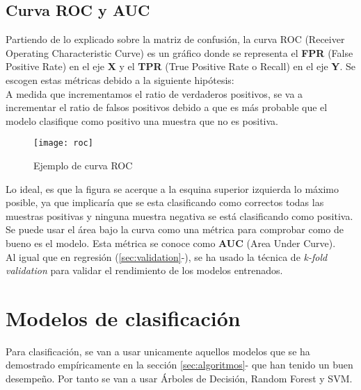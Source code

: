 \subsection{Curva ROC y AUC}
Partiendo de lo explicado sobre la matriz de confusión, la curva ROC (Receiver Operating Characteristic Curve) es un gráfico donde se representa el \textbf{FPR} (False Positive Rate) en el eje \textbf{X} y el \textbf{TPR} (True Positive Rate o Recall) en el eje \textbf{Y}. Se escogen estas métricas debido a la siguiente hipótesis:\\
A medida que incrementamos el ratio de verdaderos positivos, se va a incrementar el ratio de falsos positivos debido a que es más probable que el modelo clasifique como positivo una muestra que no es positiva.
 \begin{figure}[H]
	\centering
	\texttt{[image: roc]}
	\caption{Ejemplo de curva ROC}
	\label{fig:roc}
\end{figure}
Lo ideal, es que la figura se acerque a la esquina superior izquierda lo máximo posible, ya que implicaría que se esta clasificando como correctos todas las muestras positivas y ninguna muestra negativa se está clasificando como positiva.\\
Se puede usar el área bajo la curva  como una métrica para comprobar como de bueno es el modelo. Esta métrica se conoce como \textbf{AUC} (Area Under Curve).\\
\linebreak
Al igual que en regresión (\ref{sec:validation}-), se ha usado la técnica de \textit{k-fold validation} para validar el rendimiento de los modelos entrenados.
\section{Modelos de clasificación}
Para clasificación, se van a usar unicamente aquellos modelos que se ha demostrado empíricamente en la sección \ref{sec:algoritmos}- que han tenido un buen desempeño. Por tanto se van a usar Árboles de Decisión, Random Forest y SVM.
